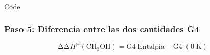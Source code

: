 \documentclass{beamer}
\begin{document}
\begin{frame}[fragile]{Code}
\frametitle{Paso 5: Diferencia entre las  dos cantidades G4}

\begin{equation}
	\mathrm{\Delta \Delta} H^{\circleddash}\mathrm{(CH_3OH) = G4\;\textrm{Entalpía} - G4\;(0\;K)}
\label{eq:4.12}
\end{equation}



\end{frame}
\end{document}
